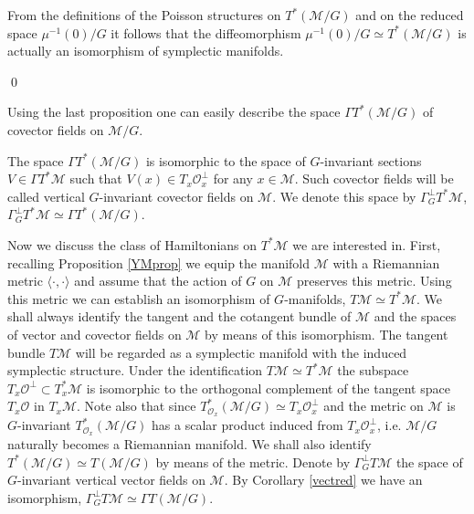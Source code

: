 \documentclass{amsart}
\begin{document}
From the definitions of
the Poisson structures on $T^*(\mathcal{M}/{G})$ and on the reduced space
$\mu^{-1}(0)/{G}$ it follows that the diffeomorphism
$\mu^{-1}(0)/{G}\simeq T^*(\mathcal{M}/{G})$ is actually an isomorphism of symplectic
manifolds.

\qed

Using the last proposition one can easily describe the space $\Gamma T^*(\mathcal{M}/{G})$ of
covector fields on $\mathcal{M}/{G}$.
\begin{corollary}\label{vectred}
The space $\Gamma T^*(\mathcal{M}/{G})$ is isomorphic to the space of
$G$-invariant sections $V\in \Gamma T^*\mathcal{M}$ such that $V(x)\in
T_x\mathcal{O}_x^\perp$ for any $x\in \mathcal{M}$. Such covector fields
will be called vertical $G$-invariant covector fields on $\mathcal{M}$. We
denote this space by $\Gamma_G^\perp T^*\mathcal{M}$,
$\Gamma_G^\perp T^*\mathcal{M}\simeq \Gamma T^*(\mathcal{M}/{G})$.
\end{corollary}

Now we discuss the class of Hamiltonians on $T^*\mathcal{M}$ we are
interested in. First, recalling Proposition \ref{YMprop} we equip the manifold
$\mathcal{M}$ with a Riemannian metric $\langle \cdot ,\cdot \rangle $ and
assume that the action of $G$ on $\mathcal{M}$  preserves
this metric. Using this metric we can establish an isomorphism of
$G$-manifolds, $T\mathcal{M}\simeq T^*\mathcal{M}$.
We shall always identify the tangent and the cotangent bundle of
$\mathcal{M}$ and the spaces of vector and covector fields on $\mathcal{M}$
by means of this isomorphism.
The tangent bundle $T\mathcal{M}$
will be regarded as a symplectic manifold with the induced symplectic structure.
Under the identification $T\mathcal{M}\simeq T^*\mathcal{M}$ the subspace
$T_x \mathcal{O}^\perp\subset T_x^*\mathcal{M}$ is isomorphic to the
orthogonal complement of the tangent space $T_x\mathcal{O}$ in
$T_x\mathcal{M}$. Note also that since
$T_{\mathcal{O}_x}^*(\mathcal{M}/{G})\simeq T_x\mathcal{O}_x^\perp$
and the metric on $\mathcal{M}$ is $G$-invariant
$T_{\mathcal{O}_x}^*(\mathcal{M}/{G})$ has a scalar product induced
from $T_x\mathcal{O}_x^\perp$, i.e. $\mathcal{M}/{G}$ naturally
becomes a Riemannian manifold. We shall also identify
$T^*(\mathcal{M}/{G})\simeq T(\mathcal{M}/{G})$ by means of the metric.
Denote by $\Gamma_G^\perp T\mathcal{M}$ the space of $G$-invariant vertical vector fields on
$\mathcal{M}$. By Corollary \ref{vectred} we have an isomorphism,
$\Gamma_G^\perp T\mathcal{M}\simeq \Gamma T(\mathcal{M}/{G})$.
\end{document}
